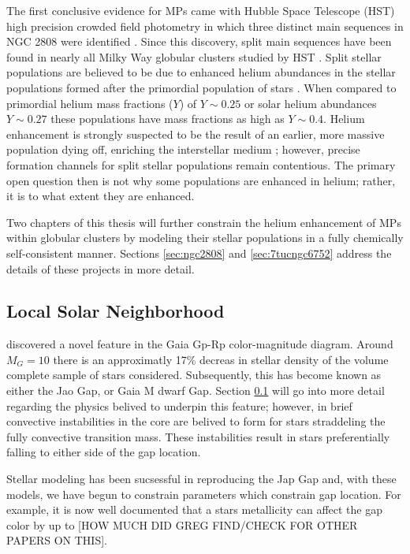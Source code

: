 The first conclusive evidence for MPs came with Hubble Space Telescope (HST)
high precision crowded field photometry in which three distinct main sequences
in NGC 2808 were identified \citep{Piotto2007}. Since this discovery, split
main sequences have been found in nearly all Milky Way globular clusters
studied by HST \citep{anderson2009,milone2011}. Split stellar populations are
believed to be due to enhanced helium abundances in the stellar populations
formed after the primordial population of stars \citep{d2005,Piotto2007}. When
compared to primordial helium mass fractions ($Y$) of $Y\sim 0.25$
\citep{collaboration2016planck} or solar helium abundances $Y\sim0.27$
\citep{vinyoles2017new} these populations have mass fractions as high as $Y\sim
0.4$. Helium enhancement is strongly suspected to be the result of an earlier,
more massive population dying off, enriching the interstellar medium
\citep{Gratton2001, Gratton2004, Gratton2012}; however, precise formation channels
for split stellar populations remain contentious. The primary open question then
is not why some populations are enhanced in helium; rather, it is to what
extent they are enhanced. 

Two chapters of this thesis will further constrain the helium enhancement of
MPs within globular clusters by modeling their stellar populations in a fully
chemically self-consistent manner. Sections \ref{sec:ngc2808} and
\ref{sec:7tucngc6752} address the details of these projects in more detail.

\subsection{Local Solar Neighborhood}
\citet{Jao2018} discovered a novel feature in the Gaia Gp-Rp color-magnitude
diagram. Around $M_{G}=10$ there is an approximatly 17\% decreas in stellar
density of the volume complete sample of stars \citeauthor{Jao2018} considered.
Subsequently, this has become known as either the Jao Gap, or Gaia M dwarf Gap.
Section \ref{} will go into more detail regarding the physics belived to
underpin this feature; however, in brief convective instabilities in the core
are belived to form for stars straddeling the fully convective transition mass.
These instabilities result in stars preferentially falling to either side of
the gap location.

Stellar modeling has been sucsessful in reproducing the Jap Gap and, with these
models, we have begun to constrain parameters which constrain gap location. For
example, it is now well documented that a stars metallicity can affect the gap
color by up to [HOW MUCH DID GREG FIND/CHECK FOR OTHER PAPERS ON THIS]. 

